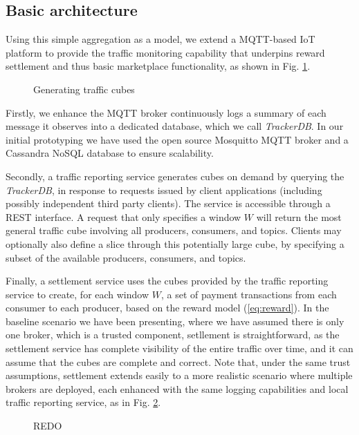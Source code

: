 \documentclass[conference]{IEEEtran}
\begin{document}
\subsection{Basic architecture}

Using this simple aggregation as a model, we extend a  MQTT-based IoT platform to provide the traffic monitoring capability that underpins reward settlement and thus basic marketplace functionality, as shown in Fig. \ref{fig:cubes}.

\begin{figure}
	\caption{Generating traffic cubes}
	\label{fig:cubes}
\end{figure}

Firstly, we enhance the MQTT broker continuously logs a summary of each message it observes into a dedicated database, which we call \textit{TrackerDB}.  In our initial prototyping we have used the open source Mosquitto MQTT broker and a Cassandra NoSQL database to ensure scalability. 

Secondly, a traffic reporting service generates cubes on demand by querying the \textit{TrackerDB}, in response to requests issued by client applications (including possibly independent third party clients). The service is accessible through a REST interface. A request that only specifies a window $ W $ will return the most general traffic cube involving all producers, consumers, and topics. Clients may optionally also define a slice through this potentially large cube, by specifying a subset of the available producers, consumers, and topics.

Finally, a settlement service uses the cubes provided by the traffic reporting service to create, for each window $ W $, a set of payment transactions from each consumer to each producer, based on the reward model (\ref{eq:reward}).
In the baseline scenario we have been presenting, where we have assumed there is only one broker, which is a trusted component, setllement is straightforward, as the settlement service has complete visibility of the entire traffic over time, and it can assume that the cubes are complete and correct.
Note that, under the same trust assumptions, settlement extends easily to a more realistic scenario where multiple brokers are deployed, each enhanced with the same logging capabilities and local traffic reporting service, as in Fig. \ref{fig:cubes-in-context}.

\begin{figure}
	\caption{REDO}
	\label{fig:cubes-in-context}
\end{figure}
\end{document}
